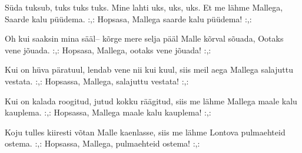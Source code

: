 S\"uda tuksub, tuks tuks tuks.
Mine lahti uks, uks, uks.
Et me l\"ahme Mallega,
Saarde kalu p\"u\"udema.
:,: Hopsasa, Mallega
saarde kalu p\"u\"udema! :,: 

Oh kui saaksin mina s\"a\"al--
k\~orge mere selja p\"a\"al
Malle k\~orval s\~ouada,
Ootaks vene j\~ouada.
:,: Hopsasa, Mallega,
ootaks vene j\~ouada! :,: 

Kui on h\"uva p\"aratuul,
lendab vene nii kui kuul,
siis meil aega Mallega
salajuttu vestata.
:,: Hopsassa, Mallega,
salajuttu vestata! :,: 

Kui on kalada roogitud,
jutud kokku r\"a\"agitud,
siis me l\"ahme Mallega
maale kalu kauplema.
:,: Hopsassa, Mallega
maale kalu kauplema! :,: 

\clearpage Koju tulles kiiresti
v\~otan Malle kaenlasse,
siis me l\"ahme Lontova
pulmaehteid ostema.
:,: Hopsassa, Mallega,
pulmaehteid ostema! :,: 